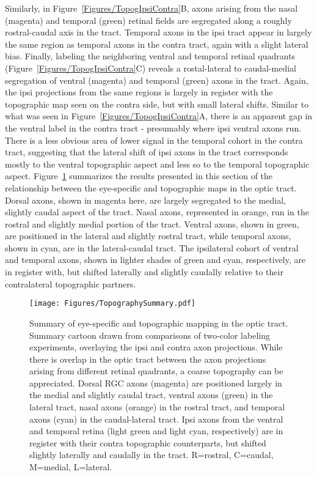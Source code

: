 Similarly, in Figure~\ref{Figures/TopogIpsiContra}B, axons arising from the nasal (magenta) and temporal (green) retinal fields are segregated along a roughly rostral-caudal axis in the tract.
Temporal axons in the ipsi tract appear in largely the same region as temporal axons in the contra tract, again with a slight lateral bias.
Finally, labeling the neighboring ventral and temporal retinal quadrants (Figure~\ref{Figures/TopogIpsiContra}C) reveals a rostal-lateral to caudal-medial segregation of ventral (magenta) and temporal (green) axons in the tract.
Again, the ipsi projections from the same regions is largely in register with the topographic map seen on the contra side, but with small lateral shifts.
Similar to what was seen in Figure~\ref{Figures/TopogIpsiContra}A, there is an apparent gap in the ventral label in the contra tract - presumably where ipsi ventral axons run.
There is a less obvious area of lower signal in the temporal cohort in the contra tract, suggesting that the lateral shift of ipsi axons in the tract corresponds mostly to the ventral topographic aspect and less so to the temporal topographic aspect.
Figure~\ref{Figures/TopographySummary} summarizes the results presented in this section of the relationship between the eye-specific and topographic maps in the optic tract.
Dorsal axons, shown in magenta here, are largely segregated to the medial, slightly caudal aspect of the tract.
Nasal axons, represented in orange, run in the rostral and slightly medial portion of the tract.
Ventral axons, shown in green, are positioned in the lateral and slightly rostral tract, while temporal axons, shown in cyan, are in the lateral-caudal tract.
The ipsilateral cohort of ventral and temporal axons, shown in lighter shades of green and cyan, respectively, are in register with, but shifted laterally and slightly caudally relative to their contralateral topographic partners.

\begin{figure}[hbtp]
    \begin{center}
        \texttt{[image: Figures/TopographySummary.pdf]}
        \caption[Summary of eye-specific and topographic mapping in the optic tract.]
        {Summary of eye-specific and topographic mapping in the optic tract.
        Summary cartoon drawn from comparisons of two-color labeling experiments, overlaying the ipsi and contra axon projections.
        While there is overlap in the optic tract between the axon projections arising from different retinal quadrants, a coarse topography can be appreciated.
        Dorsal RGC axons (magenta) are positioned largely in the medial and slightly caudal tract, ventral axons (green) in the lateral tract, nasal axons (orange) in the rostral tract, and temporal axons (cyan) in the caudal-lateral tract.
        Ipsi axons from the ventral and temporal retina (light green and light cyan, respectively) are in register with their contra topographic counterparts, but shifted slightly laterally and caudally in the tract.
        R=rostral, C=caudal, M=medial, L=lateral.}
        \label{Figures/TopographySummary}
    \end{center}
\end{figure}
